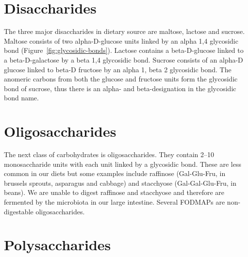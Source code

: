 \documentclass{tufte-handout}
\begin{document}
\section{Disaccharides}

The three major disaccharides in dietary source are maltose, lactose and sucrose. Maltose consists of two alpha-D-glucose units linked by an alpha 1,4 glycosidic bond (Figure~\ref{fig:glycosidic-bonds}). Lactose contains a beta-D-glucose linked to a beta-D-galactose by a beta 1,4 glycosidic bond. Sucrose consists of an alpha-D glucose linked to beta-D fructose by an alpha 1, beta 2 glycosidic bond. The anomeric carbons from both the glucose and fructose units form the glycosidic bond of sucrose, thus there is an alpha- and beta-designation in the glycosidic bond name.

\section{Oligosaccharides}

The next class of carbohydrates is oligosaccharides. They contain 2--10 monosaccharide units with each unit linked by a glycosidic bond.  These are less common in our diets but some examples include raffinose (Gal-Glu-Fru, in brussels sprouts, asparagus and cabbage) and stacchyose (Gal-Gal-Glu-Fru, in beans).  We are unable to digest raffinose and stacchyose and therefore are fermented by the microbiota in our large intestine.   Several FODMAPs are non-digestable oligosaccharides.

\section{Polysaccharides}
\end{document}
